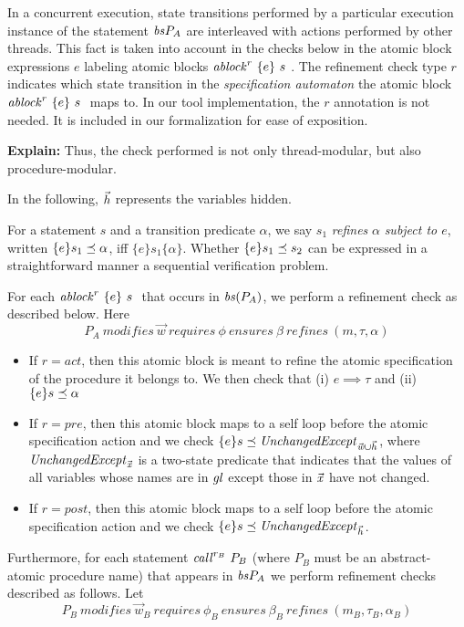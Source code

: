 
In a concurrent execution, state transitions performed by a particular execution instance of the statement $\bodies{P_{A}}$ are interleaved with actions performed by other threads. This fact is taken into account in the checks below in the atomic block expressions $e$ labeling atomic blocks $\ablock{e}{s}{r}$. The refinement check type $r$ indicates which state transition in the {\em specification automaton} the atomic block $\ablock{e}{s}{r}$ maps to. In our tool implementation, the $r$ annotation is not needed. It is included in our formalization for ease of exposition. 


{\bf Explain:} Thus, the check performed is not only thread-modular, but also procedure-modular. 

In the following, $\hiddenVars$ represents the variables hidden.

For a statement $s$ and a transition predicate $\alpha$, we say $s_1$ {\em refines} $\alpha$
{\em subject to $e$}, written $\impl{e}{s_1}{\alpha}$, iff $\{ e \} s_1 \{ \alpha \}$.
Whether $\impl{e}{s_1}{s_2}$ can be
expressed in a straightforward manner a sequential verification
problem.



For each $\ablock{e}{s}{r}$ that occurs in $\bodies(P_{A})$, we perform a refinement check as described below. Here 
$$P_{A}\ \mathit{modifies}\
\vec{w}\ \mathit{requires}\ \phi\ \mathit{ensures}\ \beta\
\mathit{refines}\ (m, \tau, \alpha)$$
\begin{itemize}
\item If $r = \mathit{act}$, then this atomic block is meant to refine the atomic specification of the procedure it belongs to. We then check that 
(i) $e \implies \tau$ and 
(ii) $\impl{e}{s}{\alpha}$
\item If $r = \mathit{pre}$, then this atomic block maps to a self loop before the atomic specification action and we check $\impl{e}{s}{\unchangedExcept{{ \ws \cup \hiddenVars}}}$, where $\unchangedExcept{\xs}$ is a two-state predicate that indicates that the values of all variables whose names are in $\vars$ except those in $\xs$ have not changed. 
\item If $r = \mathit{post}$, then this atomic block maps to a self loop before the atomic specification action and we check $\impl{e}{s}{\unchangedExcept{{ \hiddenVars}}}$. 
\end{itemize}
Furthermore, for each statement $\call{r_{B}}{P_{B}}$ (where $P_{B}$ must be an abstract-atomic procedure name) that appears in $\bodies{P_{A}}$ we perform refinement checks described as follows.
Let
$$P_{B}\ \mathit{modifies}\
\vec{w}_{B}\ \mathit{requires}\ \phi_{B}\ \mathit{ensures}\ \beta_{B}\
\mathit{refines}\ (m_{B}, \tau_{B}, \alpha_{B})$$

